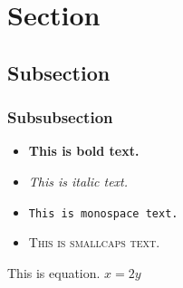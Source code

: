 \documentclass[palatino,english]{ist-report}
\begin{document}
\section{Section}

\lipsum[1]

\subsection{Subsection}

\lipsum[1-2]

\subsubsection{Subsubsection}

\begin{itemize}
	\item \textbf{This is bold text.}
	\item \textit{This is italic text.}
	\item \texttt{This is monospace text.}
	\item \textsc{This is smallcaps text.}
\end{itemize}

This is equation. $x = 2y$
\end{document}
